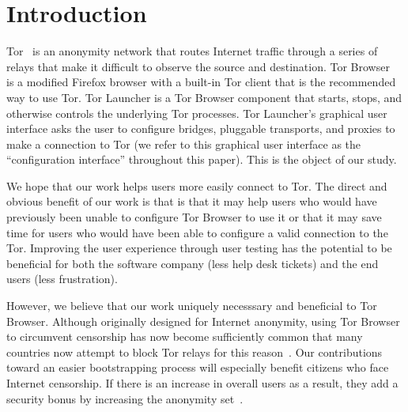 \documentclass[USenglish,oneside,twocolumn]{article}
\begin{document}


\maketitle

\section{Introduction}

Tor~\cite{dingledine2004tor} is an anonymity network that routes Internet traffic through a series of relays 
that make it difficult to observe the source and destination. 
Tor Browser~\cite{torbrowser} is a modified Firefox browser with a built-in Tor client that
is the recommended way to use Tor. Tor Launcher is a Tor Browser component that
starts, stops, and otherwise controls the underlying Tor processes.
Tor Launcher's graphical user interface asks the user to configure
bridges, pluggable transports, and proxies to make a connection to Tor (we refer to this graphical user interface as the ``configuration interface'' throughout this paper). This is the object of our study. 

We hope that our work helps users more easily connect to Tor. The direct and obvious benefit of our work is that is that it may help users who would have previously been unable to configure Tor Browser to use it or that it may save time for users who would have been able to configure a valid connection to the Tor. Improving the user experience through user testing has the potential to be beneficial for both the software company (less help desk tickets) and the end users (less frustration). 

However, we believe that our work uniquely necesssary and beneficial to Tor Browser. Although originally designed for Internet anonymity, using Tor Browser to circumvent censorship has now become sufficiently common that many countries now attempt to block Tor relays for this reason~\cite{winter2012great}. Our contributions toward an easier bootstrapping process will especially benefit citizens who face Internet censorship. If there is an increase in overall users as a result, they add a security bonus by increasing the anonymity set~\cite{dingledine2006anonymity}. \\
\end{document}
